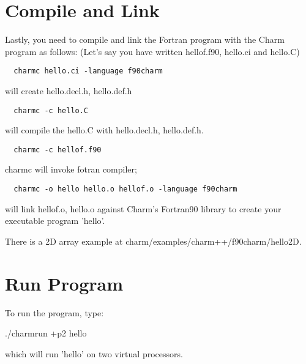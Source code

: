 \documentclass[11pt]{article}
\begin{document}
\section{Compile and Link}
Lastly, you need to compile and link the Fortran program with the
Charm program as follows: (Let's say you have written hellof.f90, 
hello.ci and hello.C)
\begin{verbatim}
  charmc hello.ci -language f90charm
\end{verbatim}
    will create hello.decl.h, hello.def.h

\begin{verbatim}
  charmc -c hello.C
\end{verbatim}
    will compile the hello.C with hello.decl.h, hello.def.h.

\begin{verbatim}
  charmc -c hellof.f90
\end{verbatim}
    charmc will invoke fotran compiler;

\begin{verbatim}
  charmc -o hello hello.o hellof.o -language f90charm
\end{verbatim}
    will link hellof.o, hello.o against Charm's Fortran90 library
    to create your executable program 'hello'.

  There is a 2D array example at charm/examples/charm++/f90charm/hello2D.

\section{Run Program}

To run the program, type:

./charmrun +p2 hello

which will run 'hello' on two virtual processors.
\end{document}
